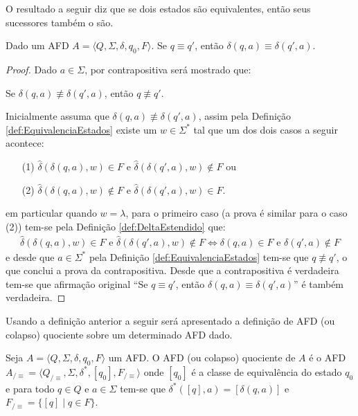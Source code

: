 O resultado a seguir diz que se dois estados são equivalentes, então seus sucessores também o são.

\begin{lema}\label{lema:SucessoresEquivalentes}
	Dado um AFD $A = \langle Q, \Sigma, \delta, q_0, F\rangle$. Se $q \equiv q'$, então $\delta(q, a) \equiv \delta(q', a)$.
\end{lema}

\begin{proof}
	Dado $a \in \Sigma$, por contrapositiva será mostrado que: 
	\begin{center}
		Se $\delta(q, a) \not\equiv \delta(q', a)$, então $q \not\equiv q'$. 
	\end{center}
	Inicialmente assuma que $\delta(q, a) \not\equiv \delta(q', a)$, assim pela Definição \ref{def:EquivalenciaEstados} existe um $w \in \Sigma^*$ tal que um dos dois casos a seguir acontece:
	\begin{itemize}
		\item[(1)] $\widehat{\delta}(\delta(q, a), w)  \in F$ e $\widehat{\delta}(\delta(q', a), w)  \notin F$ ou
		\item[(2)] $\widehat{\delta}(\delta(q, a), w)  \notin F$ e $\widehat{\delta}(\delta(q', a), w)  \in F$.
	\end{itemize}
	em particular quando $w = \lambda$, para o primeiro caso (a prova é similar para o caso (2)) tem-se pela Definição \ref{def:DeltaEstendido} que:
	\begin{eqnarray*}
		\widehat{\delta}(\delta(q, a), w)  \in F \text{ e } \widehat{\delta}(\delta(q', a), w)  \notin F \Longleftrightarrow \delta(q, a)  \in F \text{ e }\delta(q', a)  \notin F
	\end{eqnarray*}
	e desde que $a \in \Sigma^*$ pela Definição \ref{def:EquivalenciaEstados} tem-se que $q \not\equiv q'$, o que conclui a prova da contrapositiva. Desde que a contrapositiva é verdadeira tem-se que afirmação original ``Se $q \equiv q'$, então $\delta(q, a) \equiv \delta(q', a)$'' é também verdadeira.
\end{proof}

Usando a definição anterior a seguir será apresentado a definição de  AFD (ou colapso) quociente sobre um determinado AFD dado.

\begin{definition}\label{def:AFD-Quociente}
	Seja $A = \langle Q, \Sigma, \delta, q_0, F\rangle$ um AFD. O AFD (ou colapso) quociente de $A$ é o AFD $A_{/\equiv} = \langle Q_{/\equiv}, \Sigma, \delta^*, [q_0],  F_{/\equiv}\rangle$ onde $[q_0]$ é a classe de equivalência do estado $q_0$ e para todo $q \in Q$ e $a \in \Sigma$ tem-se que $\delta^*([q], a) = [\delta(q, a)]$ e  $F_{/\equiv} = \{[q] \mid q \in F\}$.
\end{definition}

